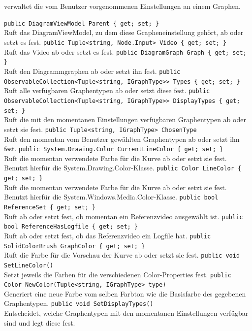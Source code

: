 \paragraph{}~\\
 verwaltet die vom Benutzer vorgenommenen Einstellungen an einem Graphen.
\begin{itemize}
	\add \verb!public DiagramViewModel Parent { get; set; }! \\
	Ruft das DiagramViewModel, zu dem diese Grapheneinstellung gehört, ab oder setzt es fest.
	\add \verb!public Tuple<string, Node.Input> Video { get; set; }! \\
	Ruft das Video ab oder setzt es fest.
	\add \verb!public DiagramGraph Graph { get; set; }! \\
	Ruft den Diagrammgraphen ab oder setzt ihn fest.
	\add \verb!public ObservableCollection<Tuple<string, IGraphType>> Types { get; set; }! \\
	Ruft alle verfügbaren Graphentypen ab oder setzt diese fest.
	\add \verb!public ObservableCollection<Tuple<string, IGraphType>> DisplayTypes { get; set; }! \\
	Ruft die mit den momentanen Einstellungen verfügbaren Graphentypen ab oder setzt sie fest.
	\add \verb!public Tuple<string, IGraphType> ChosenType! \\
	Ruft den momentan vom Benutzer gewählten Graphentypen ab oder setzt ihn fest.
	\add \verb!public System.Drawing.Color CurrentLineColor { get; set; }! \\
	Ruft die momentan verwendete Farbe für die Kurve ab oder setzt sie fest. Benutzt hierfür die System.Drawing.Color-Klasse.
	\add \verb!public Color LineColor { get; set; }! \\
	Ruft die momentan verwendete Farbe für die Kurve ab oder setzt sie fest. Benutzt hierfür die System.Windows.Media.Color-Klasse.
	\add \verb!public bool ReferenceSet { get; set; }! \\
	Ruft ab oder setzt fest, ob momentan ein Referenzvideo ausgewählt ist.
	\add \verb!public bool ReferenceHasLogfile { get; set; }! \\
	Ruft ab oder setzt fest, ob das Referenzvideo ein Logfile hat.
	\add \verb!public SolidColorBrush GraphColor { get; set; }! \\
	Ruft die Farbe für die Vorschau der Kurve ab oder setzt sie fest.
	\add \verb!public void SetLineColor()! \\
	Setzt jeweils die Farben für die verschiedenen Color-Properties fest.
	\add \verb!public Color NewColor(Tuple<string, IGraphType> type)! \\
	Generiert eine neue Farbe vom selben Farbton wie die Basisfarbe des gegebenen Graphentypen.
	\add \verb!public void SetDisplayTypes()! \\
	Entscheidet, welche Graphentypen mit den momentanen Einstellungen verfügbar sind und legt diese fest.
\end{itemize}

